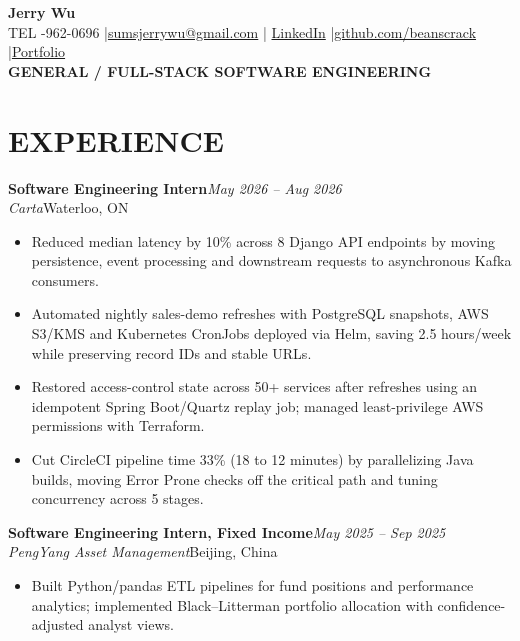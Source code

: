 \documentclass[11pt,letterpaper]{article}
\begin{document}
\begin{center}
  {\fontsize{16.7}{18}\selectfont\bfseries Jerry Wu}\\[-1pt]
  {\footnotesize TEL -962-0696 \enspace|\enspace \href{mailto:sumsjerrywu@gmail.com}{sumsjerrywu@gmail.com} \enspace|\enspace
  \href{https://www.linkedin.com/in/jerry-wu-03210a30b/}{LinkedIn} \enspace|\enspace \href{https://github.com/beanscrack}{github.com/beanscrack} \enspace|\enspace \href{https://website-beta-seven-81.vercel.app/}{Portfolio}}\\[1pt]
  {\fontsize{8.1}{9}\selectfont\bfseries GENERAL / FULL-STACK SOFTWARE ENGINEERING}
\end{center}
\vspace{-5pt}
\section*{EXPERIENCE}
\noindent\textbf{Software Engineering Intern}\hfill \textit{May 2026 -- Aug 2026}\\
\textit{Carta}\hfill Waterloo, ON\par
\begin{itemize}
\item Reduced median latency by 10\% across 8 Django API endpoints by moving persistence, event processing and downstream requests to asynchronous Kafka consumers.
\item Automated nightly sales-demo refreshes with PostgreSQL snapshots, AWS S3/KMS and Kubernetes CronJobs deployed via Helm, saving 2.5 hours/week while preserving record IDs and stable URLs.
\item Restored access-control state across 50+ services after refreshes using an idempotent Spring Boot/Quartz replay job; managed least-privilege AWS permissions with Terraform.
\item Cut CircleCI pipeline time 33\% (18 to 12 minutes) by parallelizing Java builds, moving Error Prone checks off the critical path and tuning concurrency across 5 stages.
\end{itemize}
\noindent\textbf{Software Engineering Intern, Fixed Income}\hfill \textit{May 2025 -- Sep 2025}\\
\textit{PengYang Asset Management}\hfill Beijing, China\par
\begin{itemize}
\item Built Python/pandas ETL pipelines for fund positions and performance analytics; implemented Black--Litterman portfolio allocation with confidence-adjusted analyst views.
\end{itemize}
\end{document}
